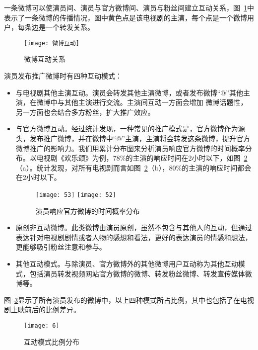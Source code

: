 一条微博可以使演员间、演员与官方微博间、演员与粉丝间建立互动关系，图~\ref{inter}中表示了一条微博的传播情况，图中黄色点是该电视剧的主演，每个点是一个微博用户，每条边是一个转发关系。
\begin{figure}[!htbp]
\centering
\texttt{[image: 微博互动]}
\caption{微博互动关系}
\label{inter}
\end{figure}

演员发布推广微博时有四种互动模式：
\begin{itemize}

\item[（1）]与电视剧其他主演互动。演员会转发其他主演微博，或者发布微博“@”其他主演，在微博中与其他主演进行交流。主演间互动一方面会增加 微博话题性，另一方面也会结合多方粉丝，扩大推广效应。

\item[（2）]与官方微博互动。经过统计发现，一种常见的推广模式是，官方微博作为源头，发布推广微博，并在微博中“@”主演，主演将会转发这条微博，提升官方微博推广的影响力。我们用累计分布图来分析演员响应官方微博的时间概率分布。以电视剧《欢乐颂》为例，78\%的主演的响应时间在2小时以下，如图~\ref{fig}（a）。统计发现，对所有电视剧而言如图~\ref{fig}（b），80\%的主演的响应时间都会在2小时以下。

\begin{figure}[h]
  \centering%
    {\texttt{[image: 53]}}
      {\texttt{[image: 52]}}
  \caption{演员响应官方微博的时间概率分布}
  \label{fig}
\end{figure}

\item[（3）]原创非互动微博。此类微博由演员原创，虽然不包含与其他人的互动，但通过表达针对电视剧剧情或者人物的感想和看法，更好的表达演员的情感和想法，更能够吸引粉丝注意和参与。

\item[（4）]其他互动模式。与除演员、官方微博外的其他微博用户互动称为其他互动模式，包括演员转发视频网站官方微博的微博、转发粉丝微博、转发宣传媒体微博等。

\end{itemize}

图~\ref{inter3}显示了所有演员发布的微博中，以上四种模式所占比例，其中也包括了在电视剧上映前后的比例差异。

\begin{figure}[!htbp]
\centering
\texttt{[image: 6]}
\caption{互动模式比例分布}
\label{inter3}
\end{figure}

